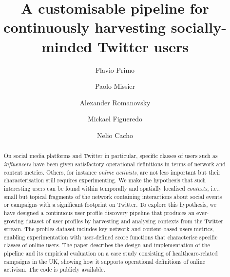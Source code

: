 \documentclass[runningheads]{llncs}
\begin{document}
    \title{A customisable pipeline for continuously harvesting socially-minded Twitter users}
    \author{Flavio Primo \and
    Paolo Missier \and
    Alexander Romanovsky \and
    Mickael Figueredo \and
    Nelio Cacho}
    
    \maketitle       %
    
    \begin{abstract}
    	On social media platforms and Twitter in particular, specific classes of users such as \textit{influencers}  have been given satisfactory operational definitions in terms of  network and content metrics.
    	Others, for instance \textit{online activists}, are not less important but their characterisation still requires experimenting.
       We make  the hypothesis that such interesting users can be found within temporally and spatially localised \textit{contexts}, i.e., small but topical fragments of the network containing interactions about social events or campaigns with a significant footprint on Twitter.
    	To explore this hypothesis, we have designed a continuous user profile discovery pipeline that produces an ever-growing dataset of user profiles by harvesting and analysing contexts from the Twitter stream.
    	The profiles dataset includes key network and content-based users metrics, enabling experimentation with user-defined score functions that characterise specific classes of online users.
        The paper describes the design and implementation of  the pipeline and its empirical evaluation on a case study consisting of healthcare-related campaigns in the UK, showing how it supports operational definitions of online activism. The code is publicly available.
    	
    \end{abstract}
    
\end{document}
